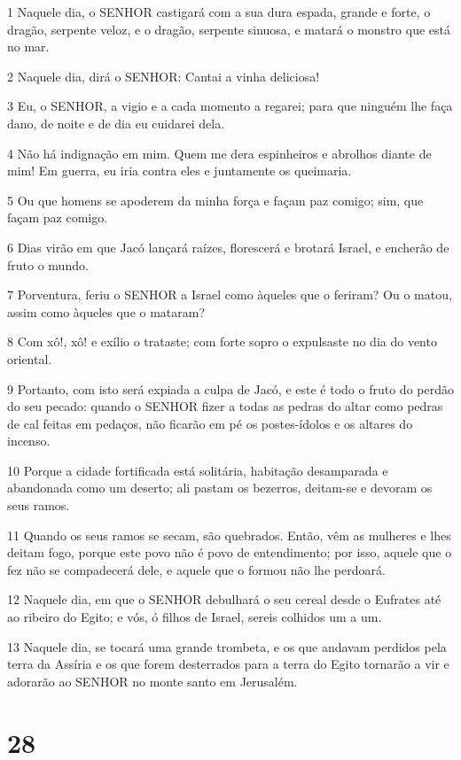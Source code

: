 \par 1 Naquele dia, o SENHOR castigará com a sua dura espada, grande e forte, o dragão, serpente veloz, e o dragão, serpente sinuosa, e matará o monstro que está no mar.
\par 2 Naquele dia, dirá o SENHOR: Cantai a vinha deliciosa!
\par 3 Eu, o SENHOR, a vigio e a cada momento a regarei; para que ninguém lhe faça dano, de noite e de dia eu cuidarei dela.
\par 4 Não há indignação em mim. Quem me dera espinheiros e abrolhos diante de mim! Em guerra, eu iria contra eles e juntamente os queimaria.
\par 5 Ou que homens se apoderem da minha força e façam paz comigo; sim, que façam paz comigo.
\par 6 Dias virão em que Jacó lançará raízes, florescerá e brotará Israel, e encherão de fruto o mundo.
\par 7 Porventura, feriu o SENHOR a Israel como àqueles que o feriram? Ou o matou, assim como àqueles que o mataram?
\par 8 Com xô!, xô! e exílio o trataste; com forte sopro o expulsaste no dia do vento oriental.
\par 9 Portanto, com isto será expiada a culpa de Jacó, e este é todo o fruto do perdão do seu pecado: quando o SENHOR fizer a todas as pedras do altar como pedras de cal feitas em pedaços, não ficarão em pé os postes-ídolos e os altares do incenso.
\par 10 Porque a cidade fortificada está solitária, habitação desamparada e abandonada como um deserto; ali pastam os bezerros, deitam-se e devoram os seus ramos.
\par 11 Quando os seus ramos se secam, são quebrados. Então, vêm as mulheres e lhes deitam fogo, porque este povo não é povo de entendimento; por isso, aquele que o fez não se compadecerá dele, e aquele que o formou não lhe perdoará.
\par 12 Naquele dia, em que o SENHOR debulhará o seu cereal desde o Eufrates até ao ribeiro do Egito; e vós, ó filhos de Israel, sereis colhidos um a um.
\par 13 Naquele dia, se tocará uma grande trombeta, e os que andavam perdidos pela terra da Assíria e os que forem desterrados para a terra do Egito tornarão a vir e adorarão ao SENHOR no monte santo em Jerusalém.

\chapter{28}

